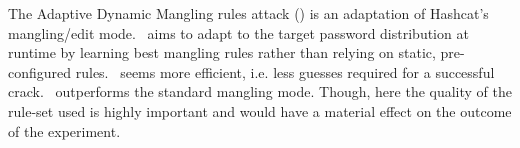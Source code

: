 The Adaptive Dynamic Mangling rules attack (\adams) is an adaptation of Hashcat's mangling/edit mode. \adamsnocite\ aims to adapt to the target password distribution at runtime by learning best mangling rules rather than relying on static, pre-configured rules. \adamsnocite\ seems more efficient, i.e. less guesses required for a successful crack. \adamsnocite\ outperforms the standard mangling mode. Though, here the quality of the rule-set used is highly important and would have a material effect on the outcome of the experiment.


